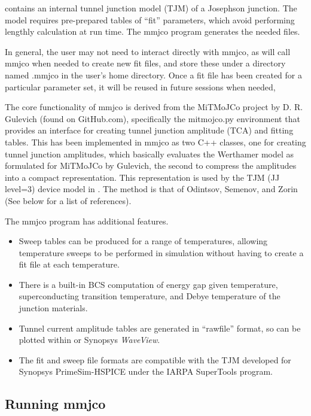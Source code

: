 
{\WRspice} contains an internal tunnel junction model (TJM) of a
Josephson junction.  The model requires pre-prepared tables of ``fit''
parameters, which avoid performing lengthly calculation at run time. 
The {\vt mmjco} program generates the needed files.

In general, the user may not need to interact directly with {\vt
mmjco}, as {\WRspice} will call {\vt mmjco} when needed to create new
fit files, and store these under a directory named {\vt .mmjco} in the
user's home directory.  Once a fit file has been created for a
particular parameter set, it will be reused in future {\WRspice}
sessions when needed,

The core functionality of {\vt mmjco} is derived from the MiTMoJCo
project by D.  R.  Gulevich (found on GitHub.com), specifically the
{\vt mitmojco.py} environment that provides an interface for creating
tunnel junction amplitude (TCA) and fitting tables.  This has been
implemented in {\vt mmjco} as two C++ classes, one for creating tunnel
junction amplitudes, which basically evaluates the Werthamer model as
formulated for MiTMoJCo by Gulevich, the second to compress the
amplitudes into a compact representation.  This representation is used
by the TJM (JJ level=3) device model in {\WRspice}.  The method is
that of Odintsov, Semenov, and Zorin (See below for a list of
references).

The {\vt mmjco} program has additional features.
\begin{itemize}
\item{Sweep tables can be produced for a range of temperatures,
allowing temperature sweeps to be performed in simulation without
having to create a fit file at each temperature.}
\item{There is a built-in BCS computation of energy gap given
temperature, superconducting transition temperature, and Debye
temperature of the junction materials.}
\item{Tunnel current amplitude tables are generated in ``rawfile''
format, so can be plotted within {\WRspice} or Synopsys
{\it WaveView}.}
\item{The fit and sweep file formats are compatible with the TJM
developed for Synopsys PrimeSim-HSPICE under the IARPA SuperTools
program.}
\end{itemize}

\subsection{Running {\vt mmjco}}

